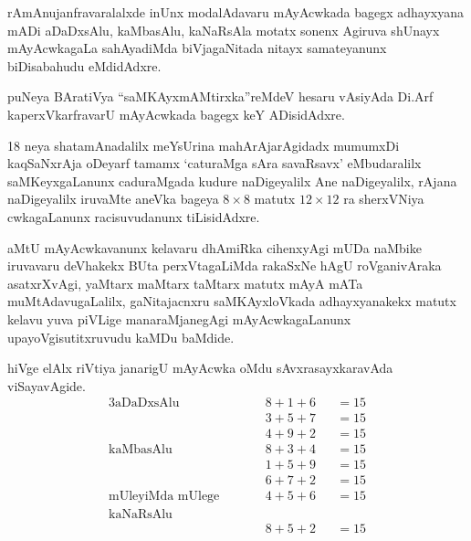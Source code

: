rAmAnujanfravaralalxde inUnx modalAdavaru mAyAcwkada bagegx adhayxyana mADi aDaDxsAlu, kaMbasAlu, kaNaRsAla motatx sonenx Agiruva shUnayx mAyAcwkagaLa sahAyadiMda biVjagaNitada nitayx samateyanunx biDisabahudu eMdidAdxre.

puNeya BAratiVya ``saMKAyxmAMtirxka''reMdeV hesaru vAsiyAda Di.Arf kaperxVkarfravarU mAyAcwkada bagegx keY ADisidAdxre.

{\rm 18} neya shatamAnadalilx meYsUrina mahArAjarAgidadx mumumxDi kaqSaNxrAja oDeyarf tamamx `caturaMga sAra savaRsavx' eMbudaralilx saMKeyxgaLanunx caduraMgada kudure naDigeyalilx Ane naDigeyalilx, rAjana naDigeyalilx iruvaMte aneVka bageya $8\times 8$ matutx $12\times 12$ ra sherxVNiya cwkagaLanunx racisuvudanunx tiLisidAdxre.

aMtU mAyAcwkavanunx kelavaru dhAmiRka cihenxyAgi mUDa naMbike iruvavaru deVhakekx BUta perxVtagaLiMda rakaSxNe hAgU roVganivAraka asatxrXvAgi, yaMtarx maMtarx taMtarx matutx mAyA mATa muMtAdavugaLalilx, gaNitajacnxru saMKAyxloVkada adhayxyanakekx matutx kelavu yuva piVLige manaraMjanegAgi mAyAcwkagaLanunx upayoVgisutitxruvudu kaMDu baMdide.

hiVge elAlx riVtiya janarigU mAyAcwka oMdu sAvxrasayxkaravAda viSayavAgide.
\begin{alignat*}{3}
\text{aDaDxsAlu }\qquad  && 8+1+6&&=15\\[0.2cm]
&&3+5+7&&=15\\
&&4+9+2&&=15\\
\text{kaMbasAlu}\qquad  &&8+3+4&&=15\\
&&1+5+9&&=15\\
&&6+7+2&&=15\\[0.2cm]
\text{mUleyiMda mUlege} \qquad & & 4+5+6&&=15\\[-0.2cm]
\text{kaNaRsAlu} \qquad  &&\\[-0.5cm]
&&8+5+2&&=15
\end{alignat*}
